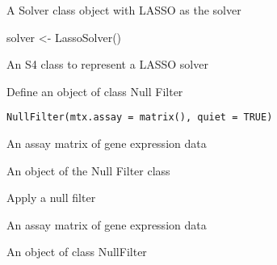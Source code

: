 \documentclass[a4paper]{book}
\begin{document}
%
\begin{Value}
A Solver class object with LASSO as the solver
\end{Value}
%
\begin{Examples}
\begin{ExampleCode}
solver <- LassoSolver()
\end{ExampleCode}
\end{Examples}
%
\begin{Description}\relax
An S4 class to represent a LASSO solver
\end{Description}
%
\begin{Description}\relax
Define an object of class Null Filter
\end{Description}
%
\begin{Usage}
\begin{verbatim}
NullFilter(mtx.assay = matrix(), quiet = TRUE)
\end{verbatim}
\end{Usage}
%
\begin{Arguments}
\begin{ldescription}
\item[\code{mtx.assay}] An assay matrix of gene expression data
\end{ldescription}
\end{Arguments}
%
\begin{Value}
An object of the Null Filter class
\end{Value}
%
\begin{Description}\relax
Apply a null filter
\end{Description}
%
\begin{Arguments}
\begin{ldescription}
\item[\code{mtx.assay}] An assay matrix of gene expression data
\end{ldescription}
\end{Arguments}
%
\begin{Value}
An object of class NullFilter
\end{Value}
\end{document}
